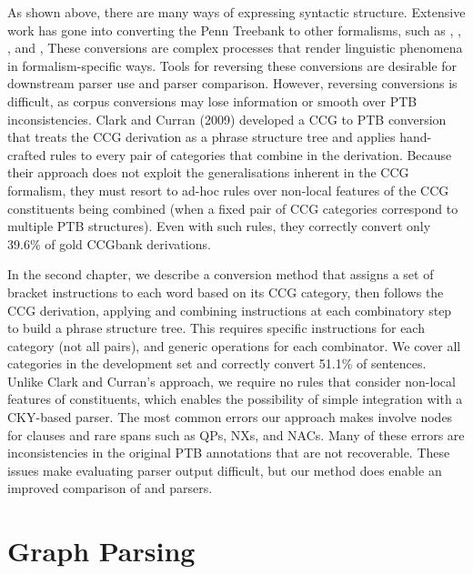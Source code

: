 As shown above, there are many ways of expressing syntactic structure.
Extensive work has gone into converting the Penn Treebank \parencite[\ptb][]{Marcus-Marcinkiewicz-Santorini:1993} to other formalisms, such as \hpsg \parencite{Miyao-Ninomiya-Tsujii:2004}, \lfg \parencite{Cahill-etal:2008}, \ltag \parencite{Xia:1999}, and \ccg \parencite{CCGBank},
These conversions are complex processes that render linguistic phenomena in formalism-specific ways.
Tools for reversing these conversions are desirable for downstream parser use and parser comparison.
However, reversing conversions is difficult, as corpus conversions may lose information or smooth over PTB inconsistencies.
Clark and Curran (2009) developed a CCG to PTB conversion that treats the CCG derivation as a phrase structure tree and applies hand-crafted rules to every pair of categories that combine in the derivation.
Because their approach does not exploit the generalisations inherent in the CCG formalism, they must resort to ad-hoc rules over non-local features of the CCG constituents being combined (when a fixed pair of CCG categories correspond to multiple PTB structures).
Even with such rules, they correctly convert only 39.6\% of gold CCGbank derivations.

In the second chapter, we describe a conversion method that assigns a set of bracket instructions to each word based on its CCG category, then follows the CCG derivation, applying and combining instructions at each combinatory step to build a phrase structure tree.
This requires specific instructions for each category (not all pairs), and generic operations for each combinator.
We cover all categories in the development set and correctly convert 51.1\% of sentences.
Unlike Clark and Curran's approach, we require no rules that consider non-local features of constituents, which enables the possibility of simple integration with a CKY-based parser.
The most common errors our approach makes involve nodes for clauses and rare spans such as QPs, NXs, and NACs.
Many of these errors are inconsistencies in the original PTB annotations that are not recoverable.
These issues make evaluating parser output difficult, but our method does enable an improved comparison of \ccg and \ptb parsers.

\section{Graph Parsing}

